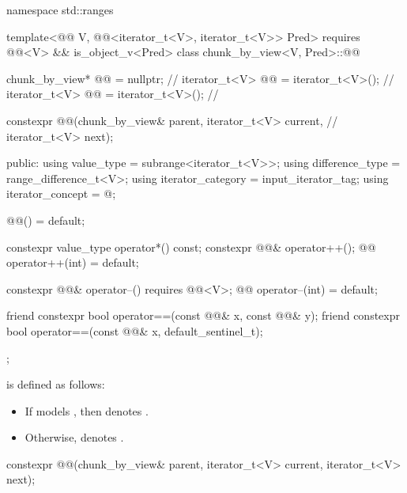 %
\begin{codeblock}
namespace std::ranges {
  template<@@ V, @@<iterator_t<V>, iterator_t<V>> Pred>
    requires @@<V> && is_object_v<Pred>
  class chunk_by_view<V, Pred>::@@ {
    chunk_by_view* @@ = nullptr;                                   // \expos
    iterator_t<V> @@ = iterator_t<V>();                           // \expos
    iterator_t<V> @@    = iterator_t<V>();                           // \expos

    constexpr @@(chunk_by_view& parent, iterator_t<V> current,    // \expos
                       iterator_t<V> next);

  public:
    using value_type = subrange<iterator_t<V>>;
    using difference_type  = range_difference_t<V>;
    using iterator_category = input_iterator_tag;
    using iterator_concept = @\seebelow@;

    @@() = default;

    constexpr value_type operator*() const;
    constexpr @@& operator++();
    @@ operator++(int) = default;

    constexpr @@& operator--() requires @@<V>;
    @@ operator--(int) = default;

    friend constexpr bool operator==(const @@& x, const @@& y);
    friend constexpr bool operator==(const @@& x, default_sentinel_t);
  };
}
\end{codeblock}

\pnum
{} is defined as follows:
\begin{itemize}
\item
If  models ,
then  denotes .
\item
Otherwise,  denotes .
\end{itemize}

%
\begin{itemdecl}
constexpr @@(chunk_by_view& parent, iterator_t<V> current, iterator_t<V> next);
\end{itemdecl}

